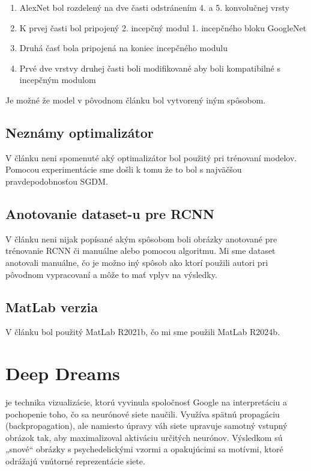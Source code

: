 \documentclass[journal,onecolumn]{IEEEtran}
\begin{document}
\begin{enumerate}
  \item AlexNet bol rozdelený na dve časti odstránením 4. a 5. konvolučnej vrsty
  \item K prvej časti bol pripojený 2. incepčný modul 1. incepčného bloku GoogleNet
  \item Druhá časť bola pripojená na koniec incepčného modulu
  \item Prvé dve vrstvy druhej časti boli modifikované aby boli kompatibilné s incepčným modulom
\end{enumerate}

Je možné že model v pôvodnom článku bol vytvorený iným spôsobom.

\subsection{Neznámy optimalizátor}
V článku neni spomenuté aký optimalizátor bol použitý pri trénovaní modelov. Pomocou experimentácie sme došli k tomu že to bol s najväčšou pravdepodobnosťou SGDM.

\subsection{Anotovanie dataset-u pre RCNN}
V článku neni nijak popísané akým spôsobom boli obrázky anotované pre trénovanie RCNN či manuálne alebo pomocou algoritmu. Mi sme dataset anotovali manuálne, čo je možno iný spôsob ako ktorí použili autori pri pôvodnom vypracovaní a môže to mať vplyv na výsledky.

\subsection{MatLab verzia}
V článku bol použitý MatLab R2021b, čo mi sme použili MatLab R2024b.

\section{Deep Dreams}
\IEEEPARstart{}{}je technika vizualizácie, ktorú vyvinula spoločnosť Google na interpretáciu a pochopenie toho, čo sa neurónové siete naučili. Využíva spätnú propagáciu (backpropagation), ale namiesto úpravy váh siete upravuje samotný vstupný obrázok tak, aby maximalizoval aktiváciu určitých neurónov. Výsledkom sú „snové“ obrázky s psychedelickými vzormi a opakujúcimi sa motívmi, ktoré odrážajú vnútorné reprezentácie siete.
\end{document}
